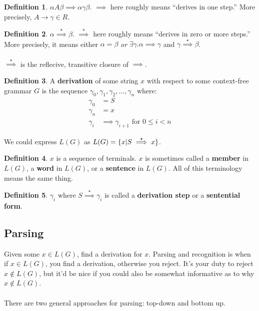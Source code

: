 \documentclass[]{article}
\DeclarePairedDelimiter{\set}{\lbrace}{\rbrace}
\theoremstyle{definition}
\newtheorem*{defn}{Definition}
\begin{document}
			\begin{defn}
				$\alpha A \beta \implies \alpha \gamma \beta$. $\implies$ here roughly means ``derives in one step.'' More precisely, $A \to \gamma \in R$.
			\end{defn}

			\begin{defn}
				$\alpha \stackrel{\star}{\implies} \beta$. $\stackrel{\star}{\implies}$ here roughly means ``derives in zero or more steps.'' More precisely, it means either $\alpha = \beta$ \emph{or} $\exists \gamma . \alpha \implies \gamma$ and $\gamma \stackrel{\star}{\implies} \beta$.
				\\ \\
				$\stackrel{\star}{\implies}$ is the reflecive, transitive closure of $\implies$.
			\end{defn}

			\begin{defn}
				A \textbf{derivation} of some string $x$ with respect to some context-free grammar $G$ is the sequence $\gamma_0, \gamma_1, \gamma_2, \ldots, \gamma_n$ where:
				\begin{align*}
					\gamma_0 &= S \\
					\gamma_n &= x \\
					\gamma_i &\implies \gamma_{i + 1} \text{ for } 0 \le i < n
				\end{align*}
			\end{defn}

			We could express $L(G)$ as $L(G) = \set{x | S \stackrel{\star}{\implies} x}$.

			\begin{defn}
				$x$ is a sequence of terminals. $x$ is sometimes called a \textbf{member} in $L(G)$, a \textbf{word} in $L(G)$, or a \textbf{sentence} in $L(G)$. All of this terminology means the same thing.
			\end{defn}

			\begin{defn}
				$\gamma_i$ where $S \stackrel{\star}{\implies} \gamma_i$ is called a \textbf{derivation step} or a \textbf{sentential form}.
			\end{defn}
			
		\subsection{Parsing}
			Given some $x \in L(G)$, find a derivation for $x$. Parsing and recognition is when if $x \in L(G)$, you find a derivation, otherwise you reject. It's your duty to reject $x \not \in L(G)$, but it'd be nice if you could also be somewhat informative as to why $x \not \in L(G)$.
			\\ \\
			There are two general approaches for parsing: top-down and bottom up.
\end{document}
